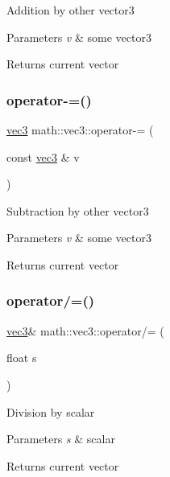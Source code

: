 Addition by other vector3 
\begin{DoxyParams}{Parameters}
{\em v} & some vector3 \\
\hline
\end{DoxyParams}
\begin{DoxyReturn}{Returns}
current vector 
\end{DoxyReturn}
\mbox{\label{structmath_1_1vec3_a4a9e71942931cebe75ca6c4a59e38e44}} 
\subsubsection{\texorpdfstring{operator-\/=()}{operator-=()}}
{\footnotesize\ttfamily \hyperlink{structmath_1_1vec3}{vec3} math\+::vec3\+::operator-\/= (\begin{DoxyParamCaption}\item[{const \hyperlink{structmath_1_1vec3}{vec3} \&}]{v }\end{DoxyParamCaption})\hspace{0.3cm}{\ttfamily [inline]}}

Subtraction by other vector3 
\begin{DoxyParams}{Parameters}
{\em v} & some vector3 \\
\hline
\end{DoxyParams}
\begin{DoxyReturn}{Returns}
current vector 
\end{DoxyReturn}
\mbox{\label{structmath_1_1vec3_a33aaa0796a55338a5a9ccc126a4c396c}} 
\subsubsection{\texorpdfstring{operator/=()}{operator/=()}}
{\footnotesize\ttfamily \hyperlink{structmath_1_1vec3}{vec3}\& math\+::vec3\+::operator/= (\begin{DoxyParamCaption}\item[{float}]{s }\end{DoxyParamCaption})\hspace{0.3cm}{\ttfamily [inline]}}

Division by scalar 
\begin{DoxyParams}{Parameters}
{\em s} & scalar \\
\hline
\end{DoxyParams}
\begin{DoxyReturn}{Returns}
current vector 
\end{DoxyReturn}
\mbox{\label{structmath_1_1vec3_ab44d4240ab19e9c9905e26ce192029b0}} 
